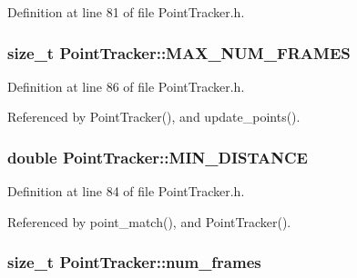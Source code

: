 \-Definition at line 81 of file \-Point\-Tracker.\-h.

\hypertarget{class_point_tracker_acb445ed3b433172cb10172db77ed702a}{
\subsubsection[{\-M\-A\-X\-\_\-\-N\-U\-M\-\_\-\-F\-R\-A\-M\-E\-S}]{\setlength{\rightskip}{0pt plus 5cm}size\-\_\-t {\bf \-Point\-Tracker\-::\-M\-A\-X\-\_\-\-N\-U\-M\-\_\-\-F\-R\-A\-M\-E\-S}}}
\label{class_point_tracker_acb445ed3b433172cb10172db77ed702a}


\-Definition at line 86 of file \-Point\-Tracker.\-h.



\-Referenced by \-Point\-Tracker(), and update\-\_\-points().

\hypertarget{class_point_tracker_a3cbc1fe8d39f2c8183654a67f914fa37}{
\subsubsection[{\-M\-I\-N\-\_\-\-D\-I\-S\-T\-A\-N\-C\-E}]{\setlength{\rightskip}{0pt plus 5cm}double {\bf \-Point\-Tracker\-::\-M\-I\-N\-\_\-\-D\-I\-S\-T\-A\-N\-C\-E}}}
\label{class_point_tracker_a3cbc1fe8d39f2c8183654a67f914fa37}


\-Definition at line 84 of file \-Point\-Tracker.\-h.



\-Referenced by point\-\_\-match(), and \-Point\-Tracker().

\hypertarget{class_point_tracker_aa32e4991c19d192737ae6d5db32a504a}{
\subsubsection[{num\-\_\-frames}]{\setlength{\rightskip}{0pt plus 5cm}size\-\_\-t {\bf \-Point\-Tracker\-::num\-\_\-frames}}}
\label{class_point_tracker_aa32e4991c19d192737ae6d5db32a504a}


